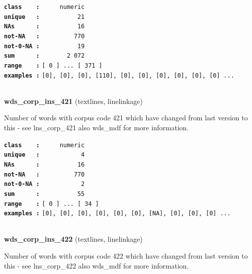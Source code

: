 \documentclass[]{article}
\begin{document}
\textbf{\texttt{class\ \ \ \ :}} \texttt{~~~~~numeric}\\
\textbf{\texttt{unique\ \ \ :}} \texttt{~~~~~~~~~~21}\\
\textbf{\texttt{NAs\ \ \ \ \ \ :}} \texttt{~~~~~~~~~~16}\\
\textbf{\texttt{not-NA\ \ \ :}} \texttt{~~~~~~~~~770}\\
\textbf{\texttt{not-0-NA\ :}} \texttt{~~~~~~~~~~19}\\
\textbf{\texttt{sum\ \ \ \ \ \ :}} \texttt{~~~~~~~2~072}\\
\textbf{\texttt{range\ \ \ \ :}}
\texttt{{[}\ 0\ {]}\ ...\ {[}\ 371\ {]}}\\
\textbf{\texttt{examples\ :}}
\texttt{{[}0{]},\ {[}0{]},\ {[}0{]},\ {[}110{]},\ {[}0{]},\ {[}0{]},\ {[}0{]},\ {[}0{]},\ {[}0{]},\ {[}0{]}\ ...}\\

~

\textbf{wds\_corp\_ins\_421} (textlines, linelinkage)

Number of words with corpus code 421 which have changed from last
version to this - see lns\_corp\_421 also wds\_mdf for more information.

\textbf{\texttt{class\ \ \ \ :}} \texttt{~~~~~numeric}\\
\textbf{\texttt{unique\ \ \ :}} \texttt{~~~~~~~~~~~4}\\
\textbf{\texttt{NAs\ \ \ \ \ \ :}} \texttt{~~~~~~~~~~16}\\
\textbf{\texttt{not-NA\ \ \ :}} \texttt{~~~~~~~~~770}\\
\textbf{\texttt{not-0-NA\ :}} \texttt{~~~~~~~~~~~2}\\
\textbf{\texttt{sum\ \ \ \ \ \ :}} \texttt{~~~~~~~~~~55}\\
\textbf{\texttt{range\ \ \ \ :}}
\texttt{{[}\ 0\ {]}\ ...\ {[}\ 34\ {]}}\\
\textbf{\texttt{examples\ :}}
\texttt{{[}0{]},\ {[}0{]},\ {[}0{]},\ {[}0{]},\ {[}0{]},\ {[}0{]},\ {[}NA{]},\ {[}0{]},\ {[}0{]},\ {[}0{]}\ ...}\\

~

\textbf{wds\_corp\_ins\_422} (textlines, linelinkage)

Number of words with corpus code 422 which have changed from last
version to this - see lns\_corp\_422 also wds\_mdf for more information.
\end{document}
